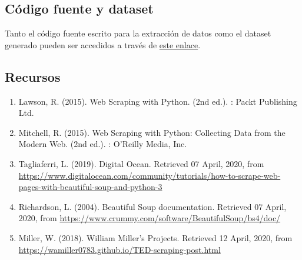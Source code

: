 \documentclass[
]{article}
\providecommand{\tightlist}{%
  \setlength{\itemsep}{0pt}\setlength{\parskip}{0pt}}
\begin{document}
\hypertarget{cuxf3digo-fuente-y-dataset}{%
\subsection{Código fuente y dataset}\label{cuxf3digo-fuente-y-dataset}}

Tanto el código fuente escrito para la extracción de datos como el
dataset generado pueden ser accedidos a través de
\href{https://github.com/Rem-Blanch/Web-scraping-TED}{este enlace}.

\hypertarget{recursos}{%
\subsection{Recursos}\label{recursos}}

\begin{enumerate}
\def\labelenumi{\arabic{enumi}.}
\tightlist
\item
  Lawson, R. (2015). Web Scraping with Python. (2nd ed.). : Packt
  Publishing Ltd.
\item
  Mitchell, R. (2015). Web Scraping with Python: Collecting Data from
  the Modern Web. (2nd ed.). : O'Reilly Media, Inc.
\item
  Tagliaferri, L. (2019). Digital Ocean. Retrieved 07 April, 2020, from
  \url{https://www.digitalocean.com/community/tutorials/how-to-scrape-web-pages-with-beautiful-soup-and-python-3}
\item
  Richardson, L. (2004). Beautiful Soup documentation. Retrieved 07
  April, 2020, from
  \url{https://www.crummy.com/software/BeautifulSoup/bs4/doc/}
\item
  Miller, W. (2018). William Miller's Projects. Retrieved 12 April,
  2020, from \url{https://wamiller0783.github.io/TED-scraping-post.html}
\end{enumerate}
\end{document}
